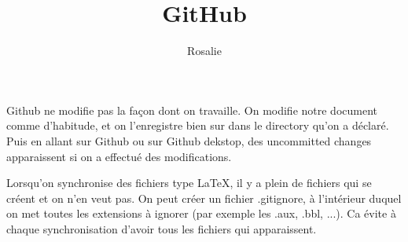\documentclass[10pt,a4paper]{article}
\author{Rosalie}
\title{GitHub}
\begin{document}
\maketitle
Github ne modifie pas la façon dont on travaille. On modifie notre document comme d'habitude, et on l'enregistre bien sur dans le directory qu'on a déclaré.
Puis en allant sur Github ou sur Github dekstop, des uncommitted changes apparaissent si on a effectué des modifications.

Lorsqu'on synchronise des fichiers type LaTeX, il y a plein de fichiers qui se créent et on n'en veut pas. On peut créer un fichier .gitignore, à l'intérieur duquel on met toutes les extensions à ignorer (par exemple les .aux, .bbl, ...). Ca évite à chaque synchronisation d'avoir tous les fichiers qui apparaissent.
\end{document}
